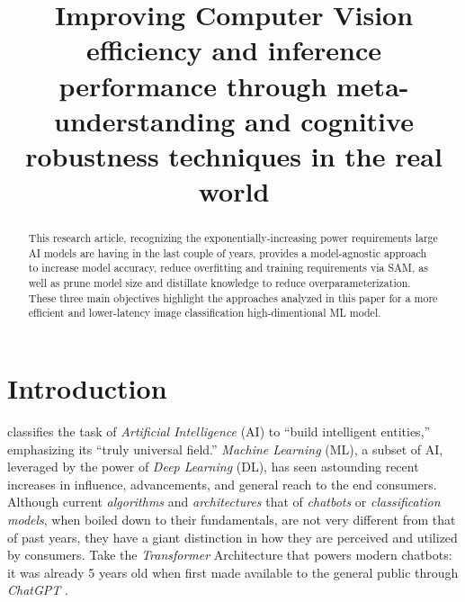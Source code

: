 \documentclass[conference]{IEEEtran}
\begin{document}
\title{\bfseries Improving Computer Vision efficiency and inference performance through meta-understanding and cognitive robustness techniques in the real world }

\author{
}

\maketitle

\begin{abstract}
This research article, recognizing the exponentially-increasing power requirements large AI models are having in the last couple of years, provides a model-agnostic approach to increase model accuracy, reduce overfitting and training requirements via SAM, as well as prune model size and distillate knowledge to reduce overparameterization. These three main objectives highlight the approaches analyzed in this paper for a more efficient and lower-latency image classification high-dimentional ML model.
\end{abstract}

\IEEEpeerreviewmaketitle

\section{Introduction} \label{introduction}

\cite[p. 1]{aima2021} classifies the task of \textit{Artificial Intelligence} (AI) to ``build intelligent entities,'' emphasizing its ``truly universal field.'' \textit{Machine Learning} (ML), a subset of AI, leveraged by the power of \textit{Deep Learning} (DL), has seen astounding recent increases in influence, advancements, and general reach to the end consumers. Although current \textit{algorithms} and \textit{architectures} that of \textit{chatbots} or \textit{classification models}, when boiled down to their fundamentals, are not very different from that of past years, they have a giant distinction in how they are perceived and utilized by consumers. Take the \textit{Transformer} Architecture that powers modern chatbots: it was already 5 years old when first made available to the general public through \textit{ChatGPT} \cite{attention2017, chatgpt2022}.
\end{document}
